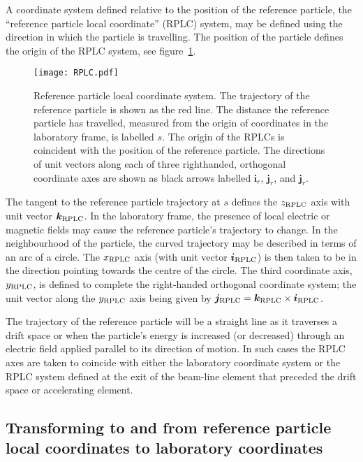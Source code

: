 A coordinate system defined relative to the position of the reference
particle, the ``reference particle local coordinate'' (RPLC) system,
may be defined using the direction in which the particle is
travelling. 
The position of the particle defines the origin of the RPLC system,
see figure~\ref{fig:RPLC}.
\begin{figure}
  \begin{center}
    \texttt{[image: RPLC.pdf]}
  \end{center}
  \caption{
    Reference particle local coordinate system.
    The trajectory of the reference particle is shown as the red line.
    The distance the reference particle has travelled, measured from
    the origin of coordinates in the laboratory frame, is labelled
    $s$.
    The origin of the RPLCs is coincident with the position of the
    reference particle.
    The directions of unit vectors along each of three righthanded,
    orthogonal coordinate axes are shown as black arrows labelled
    $\bm{i}_r$, $\bm{j}_r$, and $\bm{j}_r$. 
  }
  \label{fig:RPLC}
\end{figure}

The tangent to the reference particle trajectory at $s$ defines the
$z_{\rm RPLC}$ axis with unit vector $\bm{k}_{\rm RPLC}$.
In the laboratory frame, the presence of local electric or magnetic
fields may cause the reference particle's trajectory to change.
In the neighbourhood of the particle, the curved trajectory may be
described in terms of an arc of a circle.
The $x_{\rm RPLC}$ axis (with unit vector $\bm{i}_{\rm RPLC}$) is then
taken to be in the direction pointing towards the centre of the
circle. 
The third coordinate axis, $y_{\rm RPLC}$, is defined to complete the
right-handed orthogonal coordinate system; the unit vector along the
$y_{\rm RPLC}$ axis being given by
$\bm{j}_{\rm RPLC} = \bm{k}_{\rm RPLC} \times \bm{i}_{\rm RPLC}$.

The trajectory of the reference particle will be a straight line as it
traverses a drift space or when the particle's energy is increased (or
decreased) through an electric field applied parallel to its direction
of motion.
In such cases the RPLC axes are taken to coincide with either the
laboratory coordinate system or the RPLC system defined at the exit of
the beam-line element that preceded the drift space or accelerating
element.

\subsection{Transforming to and from reference particle local
            coordinates to laboratory coordinates}
            

